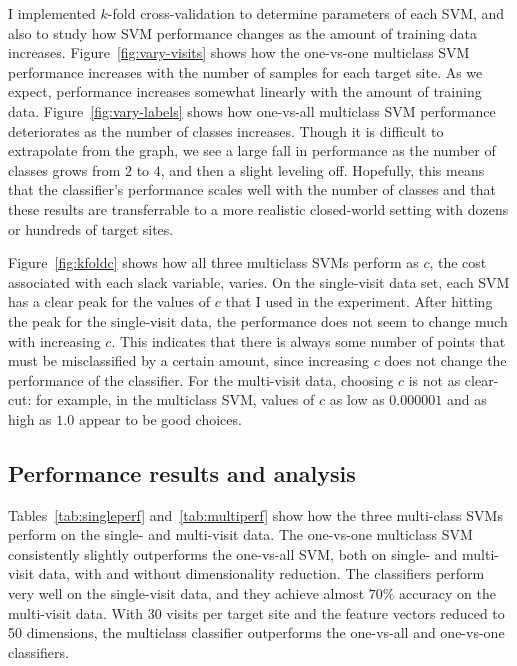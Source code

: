 \documentclass[10pt, twocolumn]{article}
\begin{document}
I implemented $k$-fold cross-validation to determine parameters of each SVM, and also to study how 
SVM performance changes as the amount of training data increases. Figure~\ref{fig:vary-visits} shows how the 
one-vs-one multiclass SVM performance increases with the number of samples for each target site. As we expect,
performance increases somewhat linearly with the amount of training data. Figure~\ref{fig:vary-labels} shows 
how one-vs-all multiclass SVM performance deteriorates as the number of classes increases. Though it is difficult 
to extrapolate from the graph, we see a large fall in performance as the number of classes grows from $2$ to $4$, 
and then a slight leveling off. Hopefully, this means that the classifier's performance scales well with the 
number of classes and that these results are transferrable to a more realistic closed-world setting with dozens or 
hundreds of target sites.

Figure~\ref{fig:kfoldc} shows how all three multiclass SVMs perform as $c$, the cost associated with each slack 
variable, varies. On the single-visit data set, each SVM has a clear peak for the values of $c$ that I used in the 
experiment. After hitting the peak for the single-visit data, the performance does not seem to change much with 
increasing $c$. This indicates that there is always some number of points that must be misclassified by a certain amount, 
since increasing $c$ does not change the performance of the classifier. For the multi-visit data, choosing $c$ is not 
as clear-cut: for example, in the multiclass SVM, values of $c$ as low as $0.000001$ and as high as $1.0$ appear to be 
good choices.


\subsection{Performance results and analysis}


Tables~\ref{tab:singleperf} and~\ref{tab:multiperf} show how the three multi-class SVMs perform on the single- and multi-visit data. 
The one-vs-one multiclass SVM consistently slightly outperforms the one-vs-all SVM, both on single- and multi-visit data, with and without dimensionality reduction. The classifiers perform very well on the single-visit data, and they achieve almost $70\%$ accuracy on 
the multi-visit data. With 30 visits per target site and the feature vectors reduced to 50 dimensions, the multiclass classifier
outperforms the one-vs-all and one-vs-one classifiers.
\end{document}
